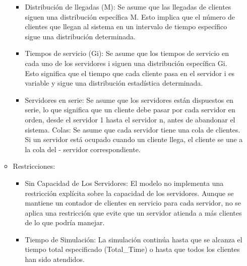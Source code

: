 \documentclass[
]{article}
\providecommand{\tightlist}{%
  \setlength{\itemsep}{0pt}\setlength{\parskip}{0pt}}
\begin{document}
\begin{itemize}
\begin{itemize}
    \begin{itemize}
    \tightlist
    \item
      Distribución de llegadas (M): Se asume que las llegadas de
      clientes siguen una distribución específica M. Esto implica que el
      número de clientes que llegan al sistema en un intervalo de tiempo
      específico sigue una distribución determinada.
    \item
      Tiempos de servicio (Gi): Se asume que los tiempos de servicio en
      cada uno de los servidores i siguen una distribución específica
      Gi. Esto significa que el tiempo que cada cliente pasa en el
      servidor i es variable y sigue una distribución estadística
      determinada.
    \item
      Servidores en serie: Se asume que los servidores están dispuestos
      en serie, lo que significa que un cliente debe pasar por cada
      servidor en orden, desde el servidor 1 hasta el servidor n, antes
      de abandonar el sistema. Colas: Se asume que cada servidor tiene
      una cola de clientes. Si un servidor está ocupado cuando un
      cliente llega, el cliente se une a la cola del - servidor
      correspondiente.
    \end{itemize}
  \item
    Restricciones:

    \begin{itemize}
    \tightlist
    \item
      Sin Capacidad de Los Servidores: El modelo no implementa una
      restricción explícita sobre la capacidad de los servidores. Aunque
      se mantiene un contador de clientes en servicio para cada
      servidor, no se aplica una restricción que evite que un servidor
      atienda a más clientes de lo que podría manejar.
    \item
      Tiempo de Simulación: La simulación continúa hasta que se alcanza
      el tiempo total especificado (Total\_Time) o hasta que todos los
      clientes han sido atendidos.
    \end{itemize}
  \end{itemize}
\end{itemize}
\end{document}
